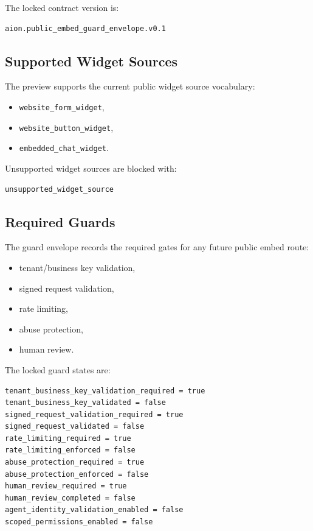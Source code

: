The locked contract version is:

\begin{verbatim}
aion.public_embed_guard_envelope.v0.1
\end{verbatim}

\subsection{Supported Widget Sources}

The preview supports the current public widget source vocabulary:

\begin{itemize}
  \item \texttt{website\_form\_widget},
  \item \texttt{website\_button\_widget},
  \item \texttt{embedded\_chat\_widget}.
\end{itemize}

Unsupported widget sources are blocked with:

\begin{verbatim}
unsupported_widget_source
\end{verbatim}

\subsection{Required Guards}

The guard envelope records the required gates for any future public embed route:

\begin{itemize}
  \item tenant/business key validation,
  \item signed request validation,
  \item rate limiting,
  \item abuse protection,
  \item human review.
\end{itemize}

The locked guard states are:

\begin{verbatim}
tenant_business_key_validation_required = true
tenant_business_key_validated = false
signed_request_validation_required = true
signed_request_validated = false
rate_limiting_required = true
rate_limiting_enforced = false
abuse_protection_required = true
abuse_protection_enforced = false
human_review_required = true
human_review_completed = false
agent_identity_validation_enabled = false
scoped_permissions_enabled = false
\end{verbatim}

